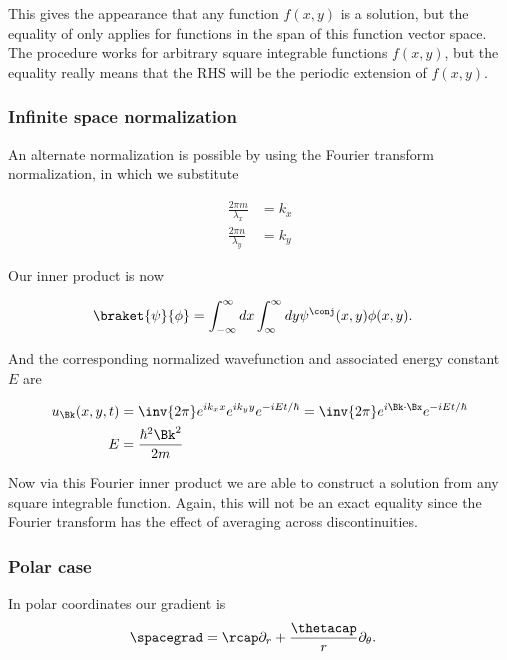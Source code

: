 This gives the appearance that any function $f(x,y)$ is a solution, but the equality of  only applies for functions in the span of this function vector space.  The procedure works for arbitrary square integrable functions $f(x,y)$, but the equality really means that the RHS will be the periodic extension of $f(x,y)$.

\subsubsection{Infinite space normalization}

An alternate normalization is possible by using the Fourier transform normalization, in which we substitute 

\begin{align}\label{eqn:desaiCh4:114}
\frac{2 \pi m }{\lambda_x} &= k_x \\
\frac{2 \pi n }{\lambda_y} &= k_y 
\end{align}

Our inner product is now

\begin{align}\label{eqn:desaiCh4:115}
\braket{\psi}{\phi} &= 
\int_{-\infty}^{\infty} dx
\int_{\infty}^{\infty} dy \psi^\conj(x,y) \phi(x,y).
\end{align}

And the corresponding normalized wavefunction and associated energy constant $E$ are

\begin{align}\label{eqn:desaiCh4:116}
u_{\Bk}(x,y,t) 
&= \inv{2\pi}
e^{i k_x x}
e^{i k_y y}
e^{-iE t/\hbar} 
= \inv{2\pi}
e^{i \Bk \cdot \Bx}
e^{-iE t/\hbar} \\
E &= \frac{\hbar^2 \Bk^2 }{2m}
\end{align}

Now via this Fourier inner product we are able to construct a solution from any square integrable function.  Again, this will not be
an exact equality since the Fourier transform has the effect of averaging across discontinuities.

\subsubsection{Polar case}

In polar coordinates our gradient is
\begin{align}\label{eqn:desaiCh4:140}
\spacegrad &= \rcap \partial_r + \frac{\thetacap}{r} \partial_\theta.
\end{align}


